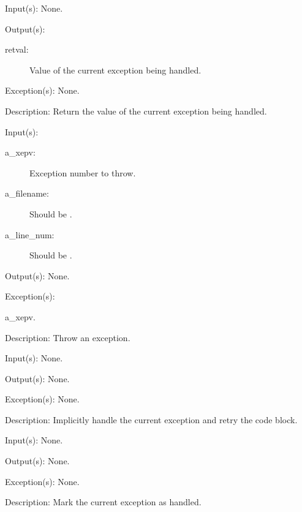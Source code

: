 \begin{capi}
\begin{capilist}
	\item[Input(s): ] None.
	\item[Output(s): ]
		\begin{description}\item[]
		\item[retval: ]
			Value of the current exception being handled.
		\end{description}
	\item[Exception(s): ] None.
	\item[Description: ]
		Return the value of the current exception being handled.
	\end{capilist}
\label{xep_throw_e}
\label{xep_throw}
	\begin{capilist}
	\item[Input(s): ]
		\begin{description}\item[]
		\item[a\_xepv: ]
			Exception number to throw.
		\item[a\_filename: ]
			Should be .
		\item[a\_line\_num: ]
			Should be .
		\end{description}
	\item[Output(s): ] None.
	\item[Exception(s): ]
		\begin{description}\item[]
		\item[a\_xepv.]
		\end{description}
	\item[Description: ]
		Throw an exception.
	\end{capilist}
\label{xep_retry}
	\begin{capilist}
	\item[Input(s): ] None.
	\item[Output(s): ] None.
	\item[Exception(s): ] None.
	\item[Description: ]
		Implicitly handle the current exception and retry the
		 code block.
	\end{capilist}
\label{xep_handled}
	\begin{capilist}
	\item[Input(s): ] None.
	\item[Output(s): ] None.
	\item[Exception(s): ] None.
	\item[Description: ]
		Mark the current exception as handled.
	\end{capilist}
\end{capi}
